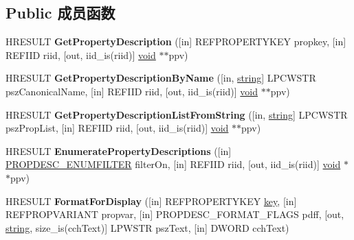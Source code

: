 \subsection*{Public 成员函数}
\begin{DoxyCompactItemize}
\item 
\mbox{\label{interface_i_property_system_a2cc1fa8de6c84ee4589d15882b430b59}} 
H\+R\+E\+S\+U\+LT {\bfseries Get\+Property\+Description} (\mbox{[}in\mbox{]} R\+E\+F\+P\+R\+O\+P\+E\+R\+T\+Y\+K\+EY propkey, \mbox{[}in\mbox{]} R\+E\+F\+I\+ID riid, \mbox{[}out, iid\+\_\+is(riid)\mbox{]} \hyperlink{interfacevoid}{void} $\ast$$\ast$ppv)
\item 
\mbox{\label{interface_i_property_system_ae33f2bf0c3787e6172605ebd0146a569}} 
H\+R\+E\+S\+U\+LT {\bfseries Get\+Property\+Description\+By\+Name} (\mbox{[}in, \hyperlink{structstring}{string}\mbox{]} L\+P\+C\+W\+S\+TR psz\+Canonical\+Name, \mbox{[}in\mbox{]} R\+E\+F\+I\+ID riid, \mbox{[}out, iid\+\_\+is(riid)\mbox{]} \hyperlink{interfacevoid}{void} $\ast$$\ast$ppv)
\item 
\mbox{\label{interface_i_property_system_a464ed230694ffb33b6e8240f1f3ef2e3}} 
H\+R\+E\+S\+U\+LT {\bfseries Get\+Property\+Description\+List\+From\+String} (\mbox{[}in, \hyperlink{structstring}{string}\mbox{]} L\+P\+C\+W\+S\+TR psz\+Prop\+List, \mbox{[}in\mbox{]} R\+E\+F\+I\+ID riid, \mbox{[}out, iid\+\_\+is(riid)\mbox{]} \hyperlink{interfacevoid}{void} $\ast$$\ast$ppv)
\item 
\mbox{\label{interface_i_property_system_a6c2761d713ea77cc76de8dcde6dfc30c}} 
H\+R\+E\+S\+U\+LT {\bfseries Enumerate\+Property\+Descriptions} (\mbox{[}in\mbox{]} \hyperlink{interfacev1__enum}{P\+R\+O\+P\+D\+E\+S\+C\+\_\+\+E\+N\+U\+M\+F\+I\+L\+T\+ER} filter\+On, \mbox{[}in\mbox{]} R\+E\+F\+I\+ID riid, \mbox{[}out, iid\+\_\+is(riid)\mbox{]} \hyperlink{interfacevoid}{void} $\ast$$\ast$ppv)
\item 
\mbox{\label{interface_i_property_system_ae05e8f33454b2726d39315b365e461b7}} 
H\+R\+E\+S\+U\+LT {\bfseries Format\+For\+Display} (\mbox{[}in\mbox{]} R\+E\+F\+P\+R\+O\+P\+E\+R\+T\+Y\+K\+EY \hyperlink{structkey}{key}, \mbox{[}in\mbox{]} R\+E\+F\+P\+R\+O\+P\+V\+A\+R\+I\+A\+NT propvar, \mbox{[}in\mbox{]} P\+R\+O\+P\+D\+E\+S\+C\+\_\+\+F\+O\+R\+M\+A\+T\+\_\+\+F\+L\+A\+GS pdff, \mbox{[}out, \hyperlink{structstring}{string}, size\+\_\+is(cch\+Text)\mbox{]} L\+P\+W\+S\+TR psz\+Text, \mbox{[}in\mbox{]} D\+W\+O\+RD cch\+Text)

\end{DoxyCompactItemize}
